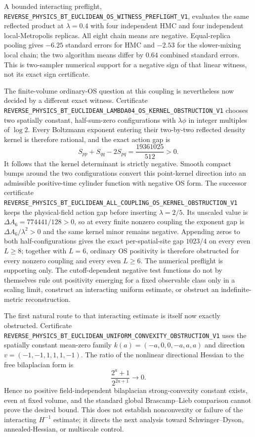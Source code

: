 \documentclass[11pt]{article}
\theoremstyle{definition}
\theoremstyle{remark}
\newcommand{\cert}[1]{\nolinkurl{#1}}
\begin{document}
A bounded interacting preflight,
\cert{REVERSE_PHYSICS_BT_EUCLIDEAN_OS_WITNESS_PREFLIGHT_V1}, evaluates the
same reflected product at \(\lambda=0.4\) with four independent HMC and four
independent local-Metropolis replicas.  All eight chain means are negative.
Equal-replica pooling gives \(-6.25\) standard errors for HMC and \(-2.53\)
for the slower-mixing local chain; the two algorithm means differ by \(0.64\)
combined standard errors.  This is two-sampler numerical support for a
negative sign of that linear witness, not its exact sign certificate.

The finite-volume ordinary-OS question at this coupling is nevertheless now
decided by a different exact witness.  Certificate
\cert{REVERSE_PHYSICS_BT_EUCLIDEAN_LAMBDA04_OS_KERNEL_OBSTRUCTION_V1}
chooses two spatially constant, half-sum-zero configurations with
\(\lambda\phi\) in integer multiples of \(\log 2\).  Every Boltzmann exponent
entering their two-by-two reflected density kernel is therefore rational, and
the exact action gap is
\[
 S_{pp}+S_{qq}-2S_{pq}=\frac{19361025}{512}>0.
\]
It follows that the kernel determinant is strictly negative.  Smooth compact
bumps around the two configurations convert this point-kernel direction into
an admissible positive-time cylinder function with negative OS form.  The
successor certificate
\cert{REVERSE_PHYSICS_BT_EUCLIDEAN_ALL_COUPLING_OS_KERNEL_OBSTRUCTION_V1}
keeps the physical-field action gap before inserting \(\lambda=2/5\).  Its
unscaled value is \(\Delta A_6=774441/128>0\), so at every finite nonzero
coupling the exponent gap is \(\Delta A_6/\lambda^2>0\) and the same kernel
minor remains negative.  Appending zeros to both half-configurations gives
the exact per-spatial-site gap \(1023/4\) on every even \(L\geq8\); together
with \(L=6\), ordinary OS positivity is therefore obstructed for every
nonzero coupling and every even \(L\geq6\).  The numerical preflight is
supporting only.  The cutoff-dependent negative test functions do not by
themselves rule out positivity emerging for a fixed observable class only in
a scaling limit, construct an interacting uniform estimate, or obstruct an
indefinite-metric reconstruction.

The first natural route to that interacting estimate is itself now exactly
obstructed.  Certificate
\cert{REVERSE_PHYSICS_BT_EUCLIDEAN_UNIFORM_CONVEXITY_OBSTRUCTION_V1}
uses the spatially constant mean-zero family
\(k(a)=(-a,0,0,-a,a,a)\) and direction
\(v=(-1,-1,1,1,1,-1)\).  The ratio of the nonlinear directional Hessian to
the free bilaplacian form is
\[
                  \frac{2^a+1}{2^{2a+1}}\longrightarrow0.
\]
Hence no positive field-independent bilaplacian strong-convexity constant
exists, even at fixed volume, and the standard global Brascamp--Lieb
comparison cannot prove the desired bound.  This does not establish
nonconvexity or failure of the interacting \(H^{-1}\) estimate; it directs the
next analysis toward Schwinger--Dyson, annealed-Hessian, or multiscale
control.
\end{document}
